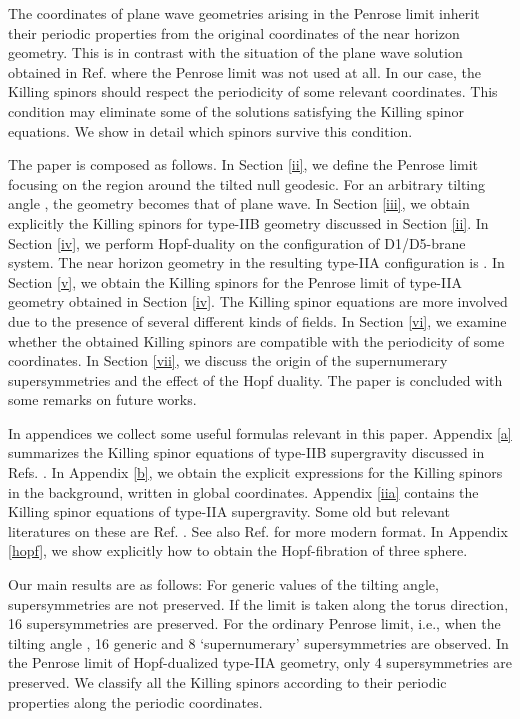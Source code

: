 \documentclass[a4paper,12pt]{article}
\begin{document}
The coordinates of plane wave geometries arising in the Penrose limit inherit their periodic properties from the original coordinates of the near horizon geometry. This is in contrast with the situation of the plane wave solution obtained in Ref. \cite{kowalski} where the Penrose limit was not used at all. In our case, the Killing spinors should respect the periodicity of some relevant coordinates. This condition may eliminate some of the solutions satisfying the Killing spinor equations. We show in detail which spinors survive this condition. 

The paper is composed as follows. In Section \ref{ii}, we define the Penrose limit focusing on the region around the tilted null geodesic. For an arbitrary tilting angle \myHighlight{$\alpha$}\coordHE{}, the geometry becomes that of plane wave. In Section \ref{iii}, we obtain explicitly the Killing spinors for type-IIB geometry discussed in Section \ref{ii}. In Section \ref{iv}, we perform Hopf-duality on the configuration of D1/D5-brane system. The near horizon geometry in the resulting type-IIA configuration is \coordHE{}. In Section \ref{v}, we obtain the Killing spinors for the Penrose limit of type-IIA geometry obtained in Section \ref{iv}. The Killing spinor equations are more involved due to the presence of several different kinds of fields. In Section \ref{vi}, we examine whether the obtained Killing spinors are compatible with the periodicity of some coordinates. 
In Section \ref{vii}, we discuss the origin of the supernumerary supersymmetries and the effect of the Hopf duality. The paper is concluded with some remarks on future works.

In appendices we collect some useful formulas relevant in this paper. Appendix \ref{a} summarizes the Killing spinor equations of type-IIB supergravity discussed in Refs. \cite{schwarz,gsw}. In Appendix \ref{b}, we obtain the explicit expressions for the Killing spinors in the \coordHE{} background, written in global coordinates. Appendix \ref{iia} contains the Killing spinor equations of type-IIA supergravity. Some old but relevant literatures on these are Ref. \cite{huq,giani}. See also Ref. \cite{hassan} for more modern format. In Appendix \ref{hopf}, we show explicitly how to obtain the Hopf-fibration of three sphere.  


Our main results are as follows:
For generic values of the tilting angle, supersymmetries are not preserved. If the limit is taken along the torus direction, 16 supersymmetries are preserved. For the ordinary Penrose limit, i.e., when the tilting angle \coordHE{}, 16 generic and 8 `supernumerary' supersymmetries are observed. In the Penrose limit of Hopf-dualized type-IIA geometry, only 4 supersymmetries are preserved. We classify all the Killing spinors according to their periodic properties along the periodic coordinates. 
\end{document}
